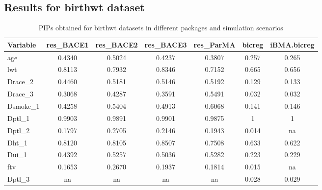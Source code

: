 \subsection{Results for birthwt dataset}

\begin{landscape}
	\begin{table}	
		\centering\small
		\begin{tabular}{lcccccc}\hline\hline
			Variable	&	res\_BACE1	&	res\_BACE2	&	res\_BACE3	&	res\_ParMA	&	bicreg	&	iBMA.bicreg	\\\hline
			age	&	0.4340	&	0.5024	&	0.4237	&	0.3807	&	0.257	&	0.265	\\
			lwt	&	0.8113	&	0.7932	&	0.8346	&	0.7152	&	0.665	&	0.656	\\
			Drace\_2	&	0.4460	&	0.5181	&	0.5146	&	0.5192	&	0.129	&	0.133	\\
			Drace\_3	&	0.3068	&	0.4287	&	0.3591	&	0.5491	&	0.032	&	0.032	\\
			Dsmoke\_1	&	0.4258	&	0.5404	&	0.4913	&	0.6068	&	0.141	&	0.146	\\
			Dptl\_1	&	0.9903	&	0.9891	&	0.9901	&	0.9875	&	1	&	1	\\
			Dptl\_2	&	0.1797	&	0.2705	&	0.2146	&	0.1943	&	0.014	&	na	\\
			Dht\_1	&	0.8120	&	0.8105	&	0.8507	&	0.7508	&	0.633	&	0.622	\\
			Dui\_1	&	0.4392	&	0.5257	&	0.5036	&	0.5282	&	0.223	&	0.229	\\
			ftv	&	0.1653	&	0.2670	&	0.1937	&	0.1814	&	0.015	&	na	\\
			Dptl\_3	&	na	&	na	&	na	&	na	&	0.028	&	0.029	\\\hline		
		\end{tabular}
		\caption{PIPs obtained for birthwt datasets in different packages and simulation scenarios}
	\end{table}
\end{landscape}
